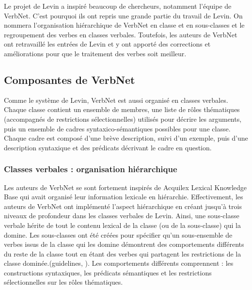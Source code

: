 Le projet de Levin a inspiré beaucoup de chercheurs, notamment l'équipe de VerbNet. C'est pourquoi ils ont repris une grande partie du travail de Levin. On nommera l'organisation hiérarchique de VerbNet en classe et en sous-classes et le regroupement des verbes en classes verbales. Toutefois, les auteurs de VerbNet ont retravaillé les entrées de Levin et y ont apporté des corrections et améliorations pour que le traitement des verbes soit meilleur\citep{verbnet.2006}.

\subsection {Composantes de VerbNet}  

Comme le système de Levin, VerbNet est aussi organisé en classes verbales. Chaque classe contient un ensemble de membres, une liste de rôles thématiques (accompagnés de restrictions sélectionnelles) utilisés pour décrire les arguments, puis un ensemble de cadres syntaxico-sémantiques possibles pour une classe. Chaque cadre est composé d'une brève description, suivi d'un exemple, puis d'une description syntaxique et des prédicats décrivant le cadre en question\citep{SchulerVerbnetBroadcoverageComprehensive2005}.

\subsubsection{Classes verbales : organisation hiérarchique}

Les auteurs de VerbNet se sont fortement inspirés de Acquilex Lexical Knowledge Base \citep{CopestakeACQUILEXLKBrepresentation1992} qui avait organisé leur information lexicale en hiérarchie. Effectivement, les auteurs de VerbNet ont implémenté l'aspect hiérarchique en créant jusqu'à trois niveaux de profondeur dans les classes verbales de Levin\citep{SchulerVerbnetBroadcoverageComprehensive2005}. Ainsi, une sous-classe verbale hérite de tout le contenu lexical de la classe (ou de la sous-classe) qui la domine. Les sous-classes ont été créées pour spécifier qu'un sous-ensemble de verbes issus de la classe qui les domine démontrent des comportements différents du reste de la classe tout en étant des verbes qui partagent les restrictions de la classe dominée.(guidelines, \citep{SchulerVerbnetBroadcoverageComprehensive2005}). Les comportements différents comprennent : les constructions syntaxiques, les prédicats sémantiques et les restrictions sélectionnelles sur les rôles thématiques.

